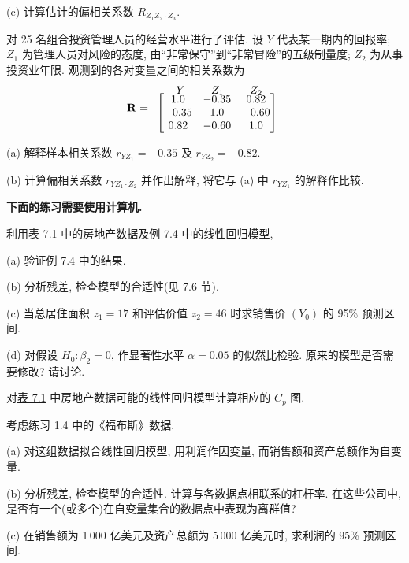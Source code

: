 \noindent (c) 计算估计的偏相关系数 $R_{Z_1Z_2\cdot Z_3}$.

\medskip
{}\quad 对 25 名组合投资管理人员的经营水平进行了评估. 设 $Y$ 代表某一期内的回报率; $Z_1$ 为管理人员对风险的态度, 由“非常保守”到“非常冒险”的五级制量度; $Z_2$ 为从事投资业年限. 观测到的各对变量之间的相关系数为
\[
\mathbf{R}=\begin{array}{c}
\begin{matrix}\hspace{0.4em}Y&\hspace{1.4em}Z_1&\hspace{1.4em}Z_2\end{matrix}\\[-4pt]
\begin{bmatrix}1.0&-0.35&0.82\\ -0.35&1.0&-0.60\\ 0.82&-0.60&1.0\end{bmatrix}
\end{array}
\]

\noindent (a) 解释样本相关系数 $r_{YZ_1}=-0.35$ 及 $r_{YZ_2}=-0.82$.

\noindent (b) 计算偏相关系数 $r_{YZ_1\cdot Z_2}$ 并作出解释, 将它与 (a) 中 $r_{YZ_1}$ 的解释作比较.

\medskip
\noindent\textbf{下面的练习需要使用计算机.}

\quad 利用\hyperref[tab:7.1]{表 7.1} 中的房地产数据及例 7.4 中的线性回归模型,

\noindent (a) 验证例 7.4 中的结果.

\noindent (b) 分析残差, 检查模型的合适性(见 7.6 节).

\noindent (c) 当总居住面积 $z_1=17$ 和评估价值 $z_2=46$ 时求销售价 $(Y_0)$ 的 95\% 预测区间.

\noindent (d) 对假设 $H_0:\beta_2=0$, 作显著性水平 $\alpha=0.05$ 的似然比检验. 原来的模型是否需要修改? 请讨论.

\medskip
{}\quad 对\hyperref[tab:7.1]{表 7.1} 中房地产数据可能的线性回归模型计算相应的 $C_p$ 图.

\medskip
{}\quad 考虑练习 1.4 中的《福布斯》数据.

\noindent (a) 对这组数据拟合线性回归模型, 用利润作因变量, 而销售额和资产总额作为自变量.

\noindent (b) 分析残差, 检查模型的合适性. 计算与各数据点相联系的杠杆率. 在这些公司中, 是否有一个(或多个)在自变量集合的数据点中表现为离群值?

\noindent (c) 在销售额为 1\,000 亿美元及资产总额为 5\,000 亿美元时, 求利润的 95\% 预测区间.
